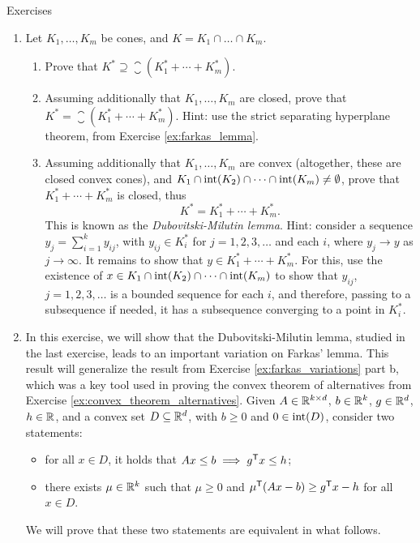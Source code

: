 \begin{xcb}{Exercises}
\begin{enumerate}[label=\thechapter.\arabic*]
\item \label{ex:dubovitski_milutin_lemma} 
  Let $K_1,\dots,K_m$ be cones, and $K = K_1 \cap \dots \cap K_m$. 

\begin{enumerate}[label=\alph*.] 
\item Prove that $K^* \supseteq \closure(K_1^* + \cdots + K_m^*)$. 
\item Assuming additionally that $K_1,\dots,K_m$ are closed, prove that
  $K^* = \closure(K_1^* + \cdots + K_m^*)$. Hint: use the strict separating
  hyperplane theorem, from Exercise \ref{ex:farkas_lemma}.      

\item Assuming additionally that $K_1,\dots,K_m$ are convex (altogether, these
  are closed convex cones), and $K_1 \cap \operatorname{int}(K_2) \cap \cdots \cap
  \operatorname{int}(K_m) \not= \emptyset$, prove that $K_1 ^* + \cdots + K_m^*$ is
  closed, thus 
  \[
  K^* = K_1^* + \cdots + K_m^*.
  \] 
  This is known as the \emph{Dubovitski-Milutin lemma}. Hint: consider a
  sequence $y_j = \sum_{i=1}^k y_{ij}$, with $y_{ij} \in K_i^*$ for $j =
  1,2,3,\dots$ and each $i$, where $y_j \to y$ as $j \to \infty$. It remains to
  show that $y \in K_1^* + \cdots + K_m^*$. For this, use the existence of $x
  \in K_1 \cap \operatorname{int}(K_2) \cap \cdots \cap \operatorname{int}(K_m)$ to show that
  $y_{ij}$, $j = 1,2,3,\dots$ is a bounded sequence for each $i$, and therefore,
  passing to a subsequence if needed, it has a subsequence converging to a point
  in $K_i^*$.  
\end{enumerate}

\item \label{ex:farkas_variations_conic} 
  In this exercise, we will show that the Dubovitski-Milutin lemma, studied in
  the last exercise, leads to an important variation on Farkas' lemma. This
  result will generalize the result from Exercise \ref{ex:farkas_variations}
  part b, which was a key tool used in proving the convex theorem of
  alternatives from Exercise \ref{ex:convex_theorem_alternatives}. Given $A \in
  \mathbb{R}^{k \times d}$, $b \in \mathbb{R}^k$, $g \in \mathbb{R}^d$, $h \in \mathbb{R}$, and a convex set $D
  \subseteq \mathbb{R}^d$, with $b \geq 0$ and $0 \in \operatorname{int}(D)$, consider two
  statements:        
  \begin{itemize}
  \item for all $x \in D$, it holds that $Ax \leq b \implies g^{\mathsf{T}} x \leq h$;  
  \item there exists $\mu \in \mathbb{R}^k$ such that $\mu \geq 0$ and $\mu^{\mathsf{T}} (Ax - b) 
    \geq g^{\mathsf{T}} x - h$ for all $x \in D$.
  \end{itemize}
  We will prove that these two statements are equivalent in what follows.
  

\end{enumerate}
\end{xcb}
